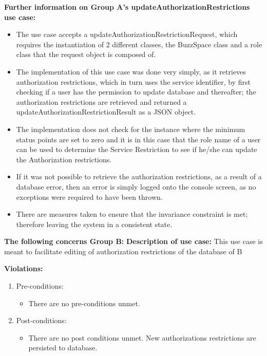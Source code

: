 \textbf{Further information on Group A's updateAuthorizationRestrictions
 use case:}
\begin{itemize}
	\item The use case accepts a updateAuthorizationRestrictionRequest, which requires the instantiation of 2 different classes, the BuzzSpace class and a role class that the request object is composed of.

\item The implementation of this use case was done very simply, as it retrieves authorization restrictions, which in turn uses the service identifier,  by first checking if a user has the permission to update database and thereafter; the authorization restrictions are retrieved and returned a updateAuthorizationRestrictionResult as a JSON object.

\item The implementation does not check for the instance where the minimum status points are set to zero and it is in this case that the role name of a user can be used to determine the Service Restriction to see if he/she can update the Authorization restrictions.

\item If it was not possible to retrieve the authorization restrictions, as a result of a database error, then an error is simply logged onto the console screen, as no exceptions were required to have been thrown.

\item There are measures taken to ensure that the invariance constraint is met; therefore leaving the system in a consistent state.

\end{itemize}

\medskip
\noindent
\textbf{The following concerns Group B:}\newline
\textbf{Description of use case:}\newline
This use case is meant to facilitate editing of authorization restrictions of the database of B
\medskip

\textbf{Violations:}
\begin{enumerate}

	\item Pre-conditions:
	\begin{itemize}
		\item There are no pre-conditions unmet. 
	\end{itemize}
	
	\item Post-conditions:
	\begin{itemize}
		\item There are no post conditions unmet. New authorizations restrictions are persisted to database.
	\end{itemize}
		
\end{enumerate}


